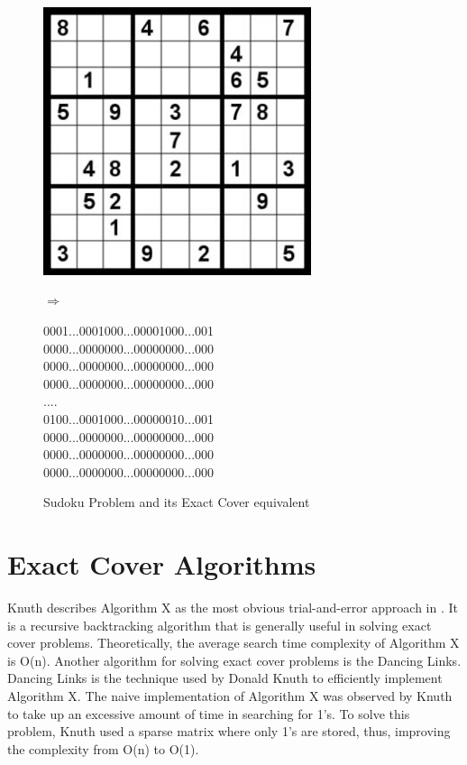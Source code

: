 \documentclass[a4paper,oneside,11pt]{report}
\newcounter{row}
\begin{document}
\begin{figure}[h]
\begin{minipage}{0.5\textwidth}
{\includegraphics[width=0.7\textwidth]{sampleduko.jpg}}
\newline
\end{minipage}
\hspace*{-1cm}$\Rightarrow$\hspace{1cm}
\begin{minipage}{0.5\textwidth}
0001...0001000...00001000...001\\
0000...0000000...00000000...000\\
0000...0000000...00000000...000\\
0000...0000000...00000000...000\\
....\\
0100...0001000...00000010...001\\
0000...0000000...00000000...000\\
0000...0000000...00000000...000\\
0000...0000000...00000000...000\\
\end{minipage}
\caption{Sudoku Problem and its Exact Cover equivalent}
\end{figure}

\newpage
\section{Exact Cover Algorithms}
Knuth describes Algorithm X as the most obvious trial-and-error approach in \cite{Knuth}. It is a recursive backtracking algorithm that is generally useful in solving exact cover problems. Theoretically, the average search time complexity of Algorithm X is O(n). Another algorithm for solving exact cover problems is the Dancing Links. Dancing Links is the technique used by Donald Knuth to efficiently implement Algorithm X. The naive implementation of Algorithm X was observed by Knuth to take up an excessive amount of time in searching for 1’s. To solve this problem, Knuth used a sparse matrix where only 1’s are stored, thus, improving the complexity from O(n) to O(1).
\end{document}
